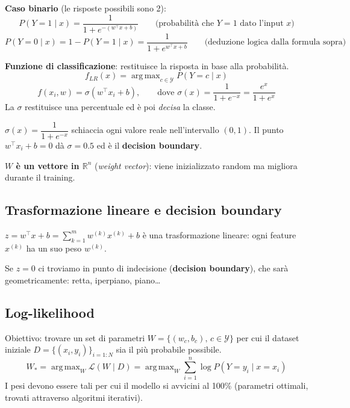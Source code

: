\documentclass[11pt,a4paper]{article}
\newcommand{\R}{\mathbb{R}}
\DeclareMathOperator*{\argmax}{arg\,max}
\begin{document}
\textbf{Caso binario} (le risposte possibili sono 2):
\[
P(Y=1\mid x) = \frac{1}{1+e^{-(w^\top x + b)}}
\qquad \text{(probabilità che } Y=1 \text{ dato l'input } x\text{)}
\]
\[
P(Y=0\mid x) = 1 - P(Y=1\mid x) = \frac{1}{1+e^{w^\top x + b}}
\qquad \text{(deduzione logica dalla formula sopra)}
\]

\textbf{Funzione di classificazione}: restituisce la risposta in base alla probabilità.
\[
f_{LR}(x) = \argmax_{c\in\mathcal{Y}} P(Y=c\mid x)
\]
\[
f(x_i,w) = \sigma(w^\top x_i + b), \qquad \text{dove } \sigma(x) = \frac{1}{1+e^{-x}} = \frac{e^x}{1+e^x}
\]
La $\sigma$ restituisce una percentuale ed è poi \emph{decisa} la classe.

\begin{definizione}
$\sigma(x) = \dfrac{1}{1+e^{-x}}$ schiaccia ogni valore reale nell'intervallo $(0,1)$. Il punto $w^\top x_i + b = 0$ dà $\sigma = 0.5$ ed è il \textbf{decision boundary}.
\end{definizione}


\begin{center}
\end{center}
\textbf{$W$ è un vettore in $\R^n$} (\emph{weight vector}): viene inizializzato random ma migliora durante il training.

\subsection{Trasformazione lineare e decision boundary}
$z = w^\top x + b = \sum_{k=1}^{m} w^{(k)} x^{(k)} + b$ è una trasformazione lineare: ogni feature $x^{(k)}$ ha un suo peso $w^{(k)}$.

Se $z=0$ ci troviamo in punto di indecisione (\textbf{decision boundary}), che sarà geometricamente: retta, iperpiano, piano\dots

\subsection{Log-likelihood}
Obiettivo: trovare un set di parametri $W=\{(w_c,b_c),\, c\in\mathcal{Y}\}$ per cui il dataset iniziale $D=\{(x_i,y_i)\}_{i=1:N}$ sia il più probabile possibile.
\[
W_* = \argmax_W \mathcal{L}(W\mid D) = \argmax_W \sum_{i=1}^{n} \log P(Y=y_i\mid x=x_i)
\]
I pesi devono essere tali per cui il modello si avvicini al 100\% (parametri ottimali, trovati attraverso algoritmi iterativi).
\end{document}
